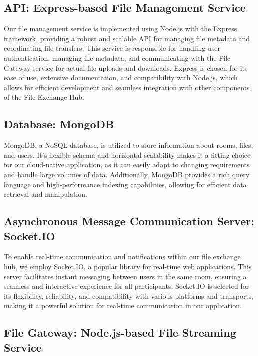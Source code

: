 \documentclass[a4paper,fleqn]{cas-dc}
\begin{document}
\subsection{API: Express-based File Management Service}

Our file management service is implemented using Node.js with the Express framework, providing a robust and scalable API for managing file metadata and coordinating file transfers. This service is responsible for handling user authentication, managing file metadata, and communicating with the File Gateway service for actual file uploads and downloads. Express is chosen for its ease of use, extensive documentation, and compatibility with Node.js, which allows for efficient development and seamless integration with other components of the File Exchange Hub.

\subsection{Database: MongoDB}

MongoDB, a NoSQL database, is utilized to store information about rooms, files, and users. It's flexible schema and horizontal scalability makes it a fitting choice for our cloud-native application, as it can easily adapt to changing requirements and handle large volumes of data. Additionally, MongoDB provides a rich query language and high-performance indexing capabilities, allowing for efficient data retrieval and manipulation.

\subsection{Asynchronous Message Communication Server: Socket.IO}

To enable real-time communication and notifications within our file exchange hub, we employ Socket.IO, a popular library for real-time web applications. This server facilitates instant messaging between users in the same room, ensuring a seamless and interactive experience for all participants. Socket.IO is selected for its flexibility, reliability, and compatibility with various platforms and transports, making it a powerful solution for real-time communication in our application.

\subsection{File Gateway: Node.js-based File Streaming Service}
\end{document}
